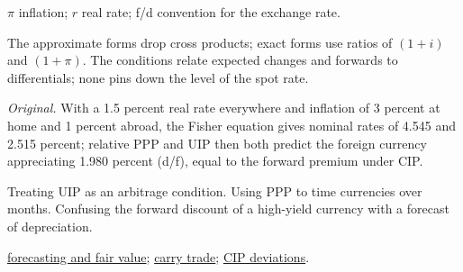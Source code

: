 \begin{qfresult}
 $\pi$ inflation; $r$ real rate; f/d convention for the exchange rate.

 The approximate forms drop cross products; exact forms use ratios of $(1+i)$ and $(1+\pi)$. The conditions relate expected changes and forwards to differentials; none pins down the level of the spot rate.

 \emph{Original.} With a 1.5 percent real rate everywhere and inflation of 3 percent at home and 1 percent abroad, the Fisher equation gives nominal rates of 4.545 and 2.515 percent; relative PPP and UIP then both predict the foreign currency appreciating 1.980 percent (d/f), equal to the forward premium under CIP.

 Treating UIP as an arbitrage condition. Using PPP to time currencies over months. Confusing the forward discount of a high-yield currency with a forecast of depreciation.

 \hyperref[meth:exchange-rate-forecasting-fair-value]{forecasting and fair value}; \hyperref[meth:carry-trade-uip]{carry trade}; \hyperref[ev:cip-deviations]{CIP deviations}.

\end{qfresult}

